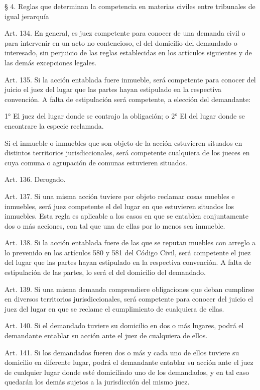     § 4. Reglas que determinan la competencia en materias civiles entre tribunales de igual jerarquía


    Art. 134. En general, es juez competente para conocer de una demanda civil o para intervenir en un acto no contencioso, el del domicilio del demandado o interesado, sin perjuicio de las reglas establecidas en los artículos siguientes y de las demás excepciones legales.

    Art. 135. Si la acción entablada fuere inmueble, será competente para conocer del juicio el juez del lugar que las partes hayan estipulado en la respectiva convención. A falta de estipulación será competente, a elección del demandante:

      1°  El juez del lugar donde se contrajo la obligación; o
      2°  El del lugar donde se encontrare la especie reclamada.

      Si el inmueble o inmuebles que son objeto de la acción estuvieren situados en distintos territorios jurisdiccionales, será competente cualquiera de los jueces en cuya comuna o agrupación de comunas estuvieren situados.


    Art. 136. Derogado.



    Art. 137. Si una misma acción tuviere por objeto reclamar cosas muebles e inmuebles, será juez competente el del lugar en que estuvieren situados los inmuebles.
    Esta regla es aplicable a los casos en que se entablen conjuntamente dos o más acciones, con tal que una de ellas por lo menos sea inmueble.


    Art. 138. Si la acción entablada fuere de las que se reputan muebles con arreglo a lo prevenido en los artículos 580 y 581 del Código Civil, será competente el juez del lugar que las partes hayan estipulado en la respectiva convención.
    A falta de estipulación de las partes, lo será el del domicilio del demandado.



    Art. 139. Si una misma demanda comprendiere obligaciones que deban cumplirse en diversos territorios jurisdiccionales, será competente para conocer del juicio el juez del lugar en que se reclame el cumplimiento de cualquiera de ellas.


    Art. 140. Si el demandado tuviere su domicilio en dos o más lugares, podrá el demandante entablar su acción ante el juez de cualquiera de ellos.


    Art. 141. Si los demandados fueren dos o más y cada uno de ellos tuviere su domicilio en diferente lugar, podrá el demandante entablar su acción ante el juez de cualquier lugar donde esté domiciliado uno de los demandados, y en tal caso quedarán los demás sujetos a la jurisdicción del mismo juez.

